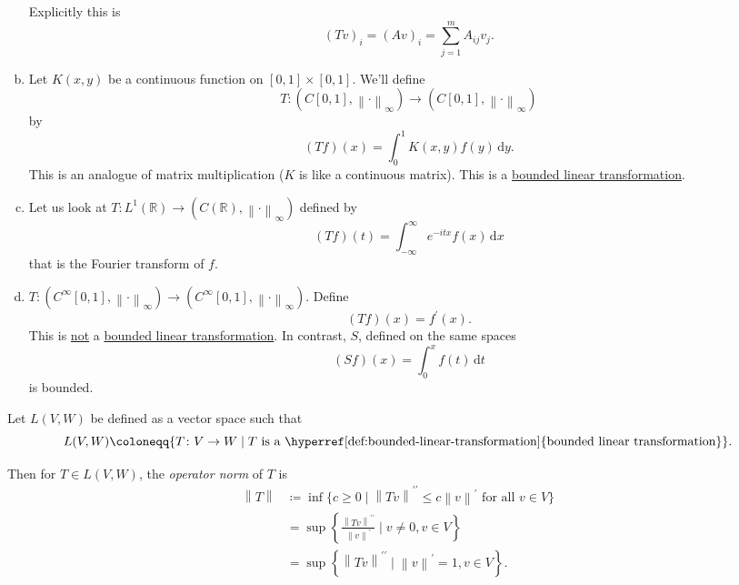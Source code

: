 \begin{eg}
\begin{enumerate}[(a)]
		      Explicitly this is
		      \[
			      (Tv)_i = (Av)_i = \sum_{j=1}^m A_{ij}v_j.
		      \]
		\item Let \(K(x,y)\) be a continuous function on \([0,1] \times [0,1]\). We'll define
		      \[
			      T \colon (C[0,1],\left\lVert \cdot\right\rVert _\infty) \to (C[0,1], \left\lVert \cdot\right\rVert _\infty)
		      \]
		      by
		      \[
			      (Tf)(x) = \int_0^1 K(x,y)f(y) \,\mathrm{d} y.
		      \]
		      This is an analogue of matrix multiplication (\(K\) is like a continuous matrix). This is a \hyperref[def:bounded-linear-transformation]{bounded linear transformation}.
		\item Let us look at \(T \colon L^1(\mathbb{R}) \to (C(\mathbb{R}),\left\lVert \cdot\right\rVert _\infty)\) defined by
		      \[
			      (Tf)(t) = \int_{-\infty}^\infty e^{-itx}f(x) \,\mathrm{d} x
		      \]
		      that is the Fourier transform of \(f\).
		\item \(T \colon (C^\infty[0,1],\left\lVert \cdot\right\rVert _\infty) \to (C^\infty[0,1], \left\lVert \cdot\right\rVert _\infty)\). Define
		      \[
			      (Tf)(x) = f^\prime (x).
		      \]
		      This is \underline{not} a \hyperref[def:bounded-linear-transformation]{bounded linear transformation}. In contrast, \(S\), defined on the same spaces
		      \[
			      (Sf)(x) = \int_0^x f(t) \,\mathrm{d} t
		      \]
		      is bounded.
	\end{enumerate}
\end{eg}

\begin{definition}\label{def:operator-norm}
	Let \(L(V, W)\) be defined as a vector space such that
	\[
		L(V,W) \coloneqq \{T \colon V \to W \mid T \text{ is a \hyperref[def:bounded-linear-transformation]{bounded linear transformation}}\}.
	\]

	Then for \(T \in L(V,W)\), the \emph{operator norm} of \(T\) is
	\[
		\begin{split}
			\left\lVert T\right\rVert & \coloneqq \inf\{c \geq 0 \mid \left\lVert Tv\right\rVert^{\prime\prime}  \leq c\left\lVert v\right\rVert^\prime  \text{ for all } v \in V\} \\
			                          & = \sup\left\{ \frac{\left\lVert Tv\right\rVert^{\prime\prime}}{\left\lVert v\right\rVert^\prime } \mid v \neq 0, v \in V\right\}            \\
			                          & = \sup\left\{ \left\lVert Tv\right\rVert^{\prime\prime} \mid \left\lVert v\right\rVert^\prime  = 1, v \in V\right\}.
		\end{split}
	\]
\end{definition}

